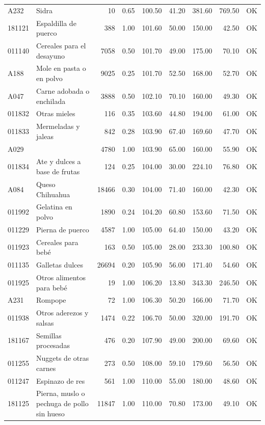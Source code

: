 \begin{table}[ht]
\begin{tabular}{llrrrrrrl}
  A232 & Sidra &  10 & 0.65 & 100.50 & 41.20 & 381.60 & 769.50 & OK \\ 
  181121 & Espaldilla de puerco & 388 & 1.00 & 101.60 & 50.00 & 150.00 & 42.50 & OK \\ 
  011140 & Cereales para el desayuno & 7058 & 0.50 & 101.70 & 49.00 & 175.00 & 70.10 & OK \\ 
  A188 & Mole en pasta o en polvo & 9025 & 0.25 & 101.70 & 52.50 & 168.00 & 52.70 & OK \\ 
  A047 & Carne adobada o enchilada & 3888 & 0.50 & 102.10 & 70.10 & 160.00 & 49.30 & OK \\ 
  011832 & Otras mieles & 116 & 0.35 & 103.60 & 44.80 & 194.00 & 61.00 & OK \\ 
  011833 & Mermeladas y jaleas & 842 & 0.28 & 103.90 & 67.40 & 169.60 & 47.70 & OK \\ 
  A029 &  & 4780 & 1.00 & 103.90 & 65.00 & 160.00 & 55.90 & OK \\ 
  011834 & Ate y dulces a base de frutas & 124 & 0.25 & 104.00 & 30.00 & 224.10 & 76.80 & OK \\ 
  A084 & Queso Chihuahua & 18466 & 0.30 & 104.00 & 71.40 & 160.00 & 42.30 & OK \\ 
  011992 & Gelatina en polvo & 1890 & 0.24 & 104.20 & 60.80 & 153.60 & 71.50 & OK \\ 
  011229 & Pierna de puerco & 4587 & 1.00 & 105.00 & 64.40 & 150.00 & 43.20 & OK \\ 
  011923 & Cereales para bebé & 163 & 0.50 & 105.00 & 28.00 & 233.30 & 100.80 & OK \\ 
  011135 & Galletas dulces & 26694 & 0.20 & 105.90 & 56.00 & 171.40 & 54.60 & OK \\ 
  011925 & Otros alimentos para bebé &  19 & 1.00 & 106.20 & 13.80 & 343.30 & 246.50 & OK \\ 
  A231 & Rompope &  72 & 1.00 & 106.30 & 50.20 & 166.00 & 71.70 & OK \\ 
  011938 & Otros aderezos y salsas & 1474 & 0.22 & 106.70 & 50.00 & 320.00 & 191.70 & OK \\ 
  181167 & Semillas procesadas & 476 & 0.20 & 107.90 & 49.00 & 200.00 & 69.60 & OK \\ 
  011255 & Nuggets de otras carnes & 273 & 0.50 & 108.00 & 59.10 & 179.60 & 56.50 & OK \\ 
  011247 & Espinazo de res & 561 & 1.00 & 110.00 & 55.00 & 180.00 & 48.60 & OK \\ 
  181125 & Pierna, muslo o pechuga de pollo sin hueso & 11847 & 1.00 & 110.00 & 70.80 & 173.00 & 49.10 & OK \\ 

\end{tabular}
\end{table}
